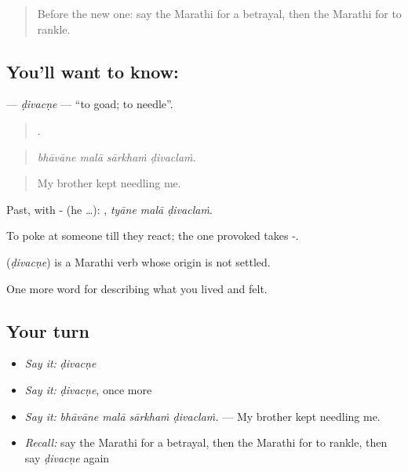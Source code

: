 \label{lesson:MR-C503-divacne}



\begin{quote}
Before the new one: say the Marathi for a betrayal, then the Marathi for to rankle.
\end{quote}

\subsection*{You'll want to know: }
\textbf{} — \emph{ḍivacṇe} — \textquotedblleft{}to goad; to needle\textquotedblright{}.

\begin{quote}
   .
\end{quote}

\begin{quote}
\emph{bhāvāne malā sārkhaṁ ḍivaclaṁ.}
\end{quote}

\begin{quote}
My brother kept needling me.
\end{quote}

Past, with - (he …):   , \emph{tyāne malā ḍivaclaṁ}.

To poke at someone till they react; the one provoked takes -.

\begin{cousinweb}
\textbf{} (\emph{ḍivacṇe}) is a Marathi verb whose origin is not settled.
\end{cousinweb}

\begin{grammarlens}[title={What you've built}]
One more word for describing what you lived and felt.
\end{grammarlens}

\subsection*{Your turn}
\begin{itemize}
\raggedright
  \item \emph{Say it:} \emph{ḍivacṇe}
  \item \emph{Say it:} \emph{ḍivacṇe}, once more
  \item \emph{Say it:} \emph{bhāvāne malā sārkhaṁ ḍivaclaṁ.} — My brother kept needling me.
  \item \emph{Recall:} say the Marathi for a betrayal, then the Marathi for to rankle, then say \emph{ḍivacṇe} again
\end{itemize}


